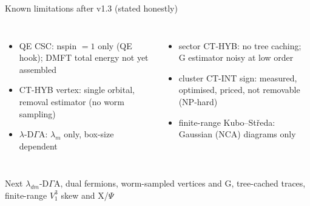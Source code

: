 \documentclass[aspectratio=169,10pt]{beamer}
\begin{document}
\begin{frame}{Known limitations after v1.3 (stated honestly)}
\begin{columns}[T]
\begin{itemize}\small
 \item QE CSC: nspin $=1$ only (QE hook); DMFT total energy not yet assembled
 \item CT-HYB vertex: single orbital, removal estimator (no worm sampling)
 \item $\lambda$-D$\Gamma$A: $\lambda_m$ only, box-size dependent
\end{itemize}
\begin{itemize}\small
 \item sector CT-HYB: no tree caching; G estimator noisy at low order
 \item cluster CT-INT sign: measured, optimised, priced, not removable (NP-hard)
 \item finite-range Kubo--St\v{r}eda: Gaussian (NCA) diagrams only
\end{itemize}
\end{columns}
\vfill
\begin{block}{Next}
\small $\lambda_{dm}$-D$\Gamma$A, dual fermions, worm-sampled vertices and G, tree-cached traces, finite-range $V_1^3$ skew and X/$\Psi$
\end{block}
\end{frame}
\end{document}
